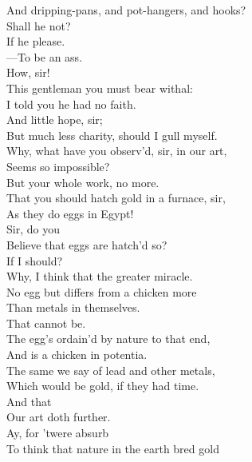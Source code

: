 \documentclass[a4paper,oneside]{memoir}
\begin{document}
\begin{drama*}
\surlyspeaks And dripping-pans, and pot-hangers, and hooks?\\
Shall he not?\\
\subtlespeaks {} If he please.\\
\surlyspeaks {} ---To be an ass.\\
\subtlespeaks How, sir!\\
\mammonspeaks {} This gentleman you must bear withal:\\
I told you he had no faith.\\
\surlyspeaks {} And little hope, sir;\\
But much less charity, should I gull myself.\\
\subtlespeaks Why, what have you observ'd, sir, in our art,\\
Seems so impossible?\\
\surlyspeaks {} But your whole work, no more.\\
That you should hatch gold in a furnace, sir,\\
As they do eggs in Egypt!\\
\subtlespeaks {} Sir, do you\\
Believe that eggs are hatch'd so?\\
\surlyspeaks {} If I should?\\
\subtlespeaks Why, I think that the greater miracle.\\
No egg but differs from a chicken more\\
Than metals in themselves.\\
\surlyspeaks {} That cannot be.\\
The egg's ordain'd by nature to that end,\\
And is a chicken in potentia.\\
\subtlespeaks The same we say of lead and other metals,\\
Which would be gold, if they had time.\\
\mammonspeaks {} And that\\
Our art doth further.\\
\subtlespeaks {} Ay, for 'twere absurb\\
To think that nature in the earth bred gold\\

\end{drama*}
\end{document}
